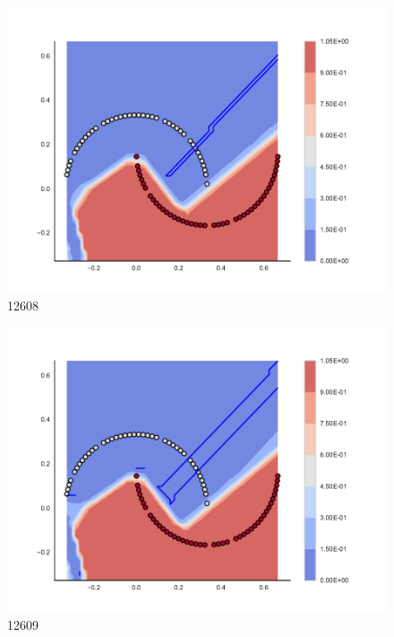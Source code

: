 \begin{subfigure}[b]{0.09\textwidth}
    \includegraphics[clip, trim=2.35cm 1.75cm 4.5cm 0cm,width=\textwidth]{img/convergence/12608.pdf}
    \caption{12608}
    \label{fig:convergence_12608}
\end{subfigure}
%
\begin{subfigure}[b]{0.09\textwidth}
    \includegraphics[clip, trim=2.35cm 1.75cm 4.5cm 0cm,width=\textwidth]{img/convergence/12609.pdf}
    \caption{12609}
    \label{fig:convergence_12609}
\end{subfigure}
%
